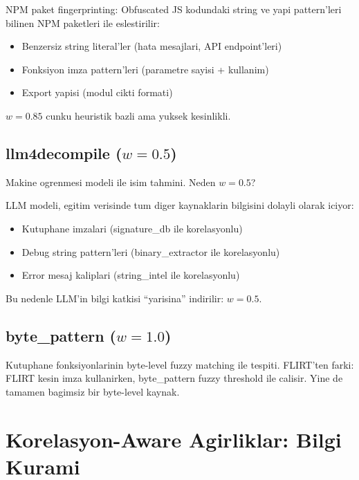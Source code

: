 NPM paket fingerprinting: Obfuscated JS kodundaki string ve yapi pattern'leri bilinen NPM paketleri ile eslestirilir:

\begin{itemize}
\item Benzersiz string literal'ler (hata mesajlari, API endpoint'leri)
\item Fonksiyon imza pattern'leri (parametre sayisi + kullanim)
\item Export yapisi (modul cikti formati)
\end{itemize}

$w = 0.85$ cunku heuristik bazli ama yuksek kesinlikli.

\subsection{llm4decompile ($w = 0.5$)}

Makine ogrenmesi modeli ile isim tahmini. Neden $w = 0.5$?

\begin{uyari}
LLM modeli, egitim verisinde tum diger kaynaklarin bilgisini dolayli olarak iciyor:
\begin{itemize}
\item Kutuphane imzalari (signature\_db ile korelasyonlu)
\item Debug string pattern'leri (binary\_extractor ile korelasyonlu)
\item Error mesaj kaliplari (string\_intel ile korelasyonlu)
\end{itemize}
Bu nedenle LLM'in bilgi katkisi ``yarisina'' indirilir: $w = 0.5$.
\end{uyari}

\subsection{byte\_pattern ($w = 1.0$)}

Kutuphane fonksiyonlarinin byte-level fuzzy matching ile tespiti. FLIRT'ten farki: FLIRT kesin imza kullanirken, byte\_pattern fuzzy threshold ile calisir. Yine de tamamen bagimsiz bir byte-level kaynak.


\section{Korelasyon-Aware Agirliklar: Bilgi Kurami}
\label{sec:correlation-theory}

